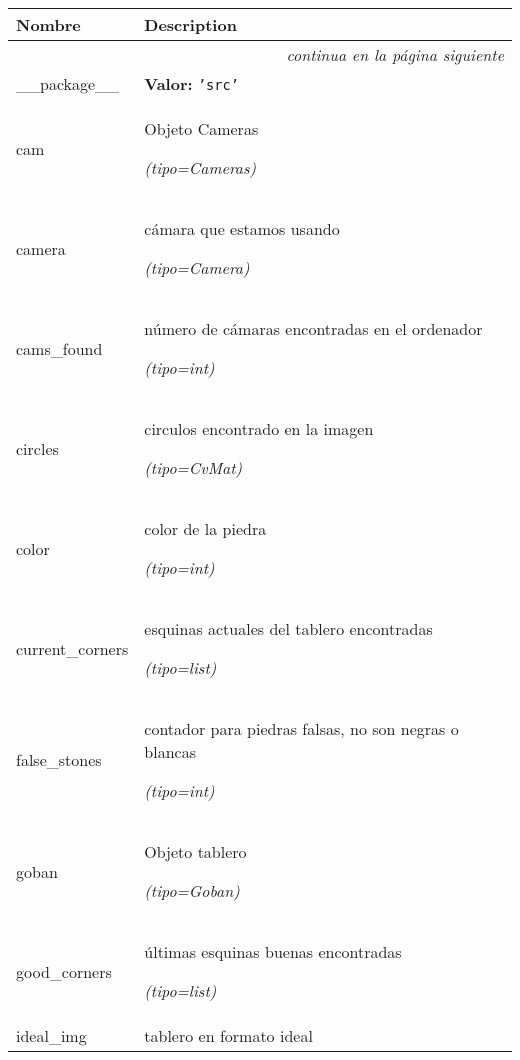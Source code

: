     \vspace{-1cm}
\hspace{\varindent}\begin{longtable}{|p{\varnamewidth}|p{\vardescrwidth}|l}
\cline{1-2}
\cline{1-2} \centering \textbf{Nombre} & \centering \textbf{Description}& \\
\cline{1-2}
\endhead\cline{1-2}\multicolumn{3}{r}{\small\textit{continua en la página siguiente}}\\\endfoot\cline{1-2}
\endlastfoot\raggedright \_\-\_\-p\-a\-c\-k\-a\-g\-e\-\_\-\_\- & \raggedright \textbf{Valor:} 
{\tt \texttt{'}\texttt{src}\texttt{'}}&\\
\cline{1-2}
\raggedright c\-a\-m\- & \raggedright Objeto Cameras

            {\it (tipo=Cameras)}&\\
\cline{1-2}
\raggedright c\-a\-m\-e\-r\-a\- & \raggedright cámara que estamos usando

            {\it (tipo=Camera)}&\\
\cline{1-2}
\raggedright c\-a\-m\-s\-\_\-f\-o\-u\-n\-d\- & \raggedright número de cámaras encontradas en el ordenador

            {\it (tipo=int)}&\\
\cline{1-2}
\raggedright c\-i\-r\-c\-l\-e\-s\- & \raggedright circulos encontrado en la imagen

            {\it (tipo=CvMat)}&\\
\cline{1-2}
\raggedright c\-o\-l\-o\-r\- & \raggedright color de la piedra

            {\it (tipo=int)}&\\
\cline{1-2}
\raggedright c\-u\-r\-r\-e\-n\-t\-\_\-c\-o\-r\-n\-e\-r\-s\- & \raggedright esquinas actuales del tablero encontradas

            {\it (tipo=list)}&\\
\cline{1-2}
\raggedright f\-a\-l\-s\-e\-\_\-s\-t\-o\-n\-e\-s\- & \raggedright contador para piedras falsas, no son negras o blancas

            {\it (tipo=int)}&\\
\cline{1-2}
\raggedright g\-o\-b\-a\-n\- & \raggedright Objeto tablero

            {\it (tipo=Goban)}&\\
\cline{1-2}
\raggedright g\-o\-o\-d\-\_\-c\-o\-r\-n\-e\-r\-s\- & \raggedright últimas esquinas buenas encontradas

            {\it (tipo=list)}&\\
\cline{1-2}
\raggedright i\-d\-e\-a\-l\-\_\-i\-m\-g\- & \raggedright tablero en formato ideal


\end{longtable}
